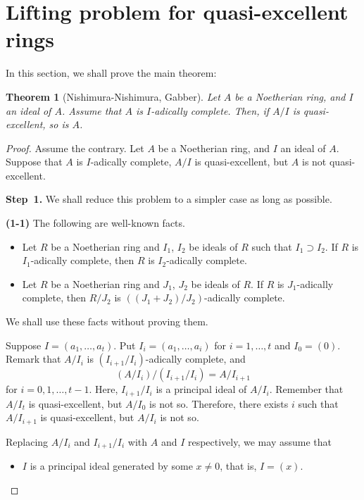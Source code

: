 \documentclass[11pt,a4paper]{amsart}
\newtheorem{theorem}{Theorem}[section]
\theoremstyle{definition}
\theoremstyle{remark}
\begin{document}
\section{Lifting problem for quasi-excellent rings}
\label{quasi-excellent4}


In this section, we shall prove the main theorem:


\begin{theorem}[Nishimura-Nishimura, Gabber]
\label{quasi-excellent}
Let $A$ be a Noetherian ring, and $I$ an ideal of $A$.
Assume that $A$ is $I$-adically complete.
Then, if $A/I$ is quasi-excellent, so is $A$.
\end{theorem}



\begin{proof}
Assume the contrary. Let $A$ be a Noetherian ring, and $I$ an ideal of $A$.
Suppose that $A$ is $I$-adically complete, $A/I$ is quasi-excellent, but $A$ is not quasi-excellent.

\vspace{2mm}

\noindent
{\bf Step~1.}
We shall reduce this problem to a simpler case as long as possible.

\vspace{2mm}

\noindent
{\bf (1-1)}
The following are well-known facts.
\begin{itemize}
\item
Let $R$ be a Noetherian ring and $I_{1}$, $I_{2}$ be ideals of $R$
such that $I_{1} \supset I_{2}$.
If $R$ is $I_{1}$-adically complete, then $R$ is $I_{2}$-adically complete.
\item
Let $R$ be a Noetherian ring and $J_{1}$, $J_{2}$ be ideals of $R$.
If $R$ is $J_{1}$-adically complete, then $R/J_{2}$ is $((J_{1}+J_{2})/J_{2})$-adically complete.
\end{itemize}
We shall use these facts without proving them.

Suppose $I = (a_{1}, \ldots, a_{t})$.
Put $I_i = (a_{1}, \ldots, a_{i})$ for $i =1,\ldots,t$ and $I_0 = (0)$.
Remark that $A/I_i$ is $(I_{i+1}/I_i)$-adically complete, and
\[
(A/I_i)/(I_{i+1}/I_{i}) = 
A/I_{i+1}
\]
for $i = 0, 1, \ldots, t-1$.
Here, $I_{i+1}/I_{i}$ is a principal ideal of $A/I_i$.
Remember that $A/I_t$ is quasi-excellent, but $A/I_0$ is not so.
Therefore, there exists $i$ such that $A/I_{i+1}$ is quasi-excellent, but $A/I_i$ is not so.

Replacing $A/I_i$ and $I_{i+1}/I_i$ with $A$ and $I$ respectively, we may assume that 
\begin{itemize}
\item[(A1)]
$I$ is a principal ideal generated by some $x \neq 0$, that is, $I=(x)$.
\end{itemize}


\end{proof}
\end{document}
